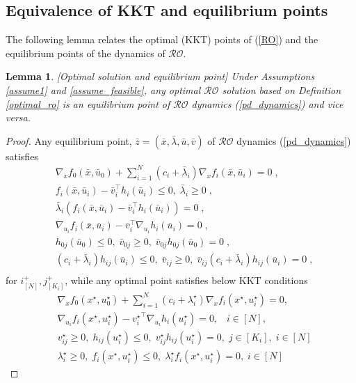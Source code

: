 \documentclass[journal,twoside,web]{ieeecolor}
\newtheorem{lemma}{Lemma}
\begin{document}
\subsection{Equivalence of KKT and equilibrium points} \label{kkt<=>eq.sec}
 The following lemma relates the optimal (KKT) points of (\ref{RO}) and the equilibrium points of the dynamics of $\mathcal{RO}$.
\begin{lemma}\label{kkttoeq.lem}[Optimal solution and equilibrium point]
Under Assumptions \ref{assume1} and \ref{assume_feasible}, any optimal $\mathcal{RO}$ solution based on Definition \ref{optimal_ro} is an equilibrium point of $\mathcal{RO}$ dynamics (\ref{pd_dynamics}) and vice versa.
\end{lemma}
\begin{proof}
Any equilibrium point, $\bar{z}=(\bar{x},\bar{\lambda},\bar{u},\bar{v})$  of $\mathcal{RO}$ dynamics (\ref{pd_dynamics}) satisfies
\begin{align*}
&\nabla_x f_0(\bar x,\bar{u}_0)+  \sum_{i=1}^N (c_i+\bar \lambda_i) \nabla_x f_i(\bar x,\bar u_i)=0\;,\\
&f_{i}(\bar x,\bar u_i)-\bar v_i^\top h_i(\bar u_i)\leq 0,\;\bar \lambda_i\geq 0\;,\\
&\bar \lambda_i(f_{i}(\bar x,\bar u_i)-\bar v_i^\top h_i(\bar u_i))=0\;,\\
&\nabla_{u_i} f_i(\bar x,\bar u_i)-\bar v_i^\top \nabla_{u_i} h_i(\bar u_i)=0\;,\\
&h_{0j}(\bar u_0)\leq 0,\; \bar v_{0j}\geq 0,\;\bar v_{0j}h_{0j}(\bar u_0)=0\;,\\
& (c_i+\bar{\lambda}_i) h_{ij}(\bar u_i)\leq 0,\; \bar v_{ij}\geq 0,\;\bar v_{ij}(c_i+\bar \lambda_i) h_{ij}(\bar u_i)=0\;,\\
\end{align*}
for $i^+_{[N]},j^+_{[K_i]}$, while any optimal point satisfies below KKT conditions
\begin{align}
    &\nabla_x f_0(x^\star,u_0^\star)+  \sum_{i=1}^N(c_i+\lambda^\star_i) \nabla_x f_i(x^\star,u_i^\star)=0, \label{kkt1} \\
    &\nabla_{u_i} f_i(x^\star,u_i^\star)-{v_i^\star}^\top \nabla_{u_i} h_i(u_i^\star)=0, \;\;\; i \in [N], \label{kkt2} \\
    &v_{ij}^\star\geq 0,\; h_{ij}(u_i^\star)\leq 0,\;v_{ij}^\star h_{ij}(u_i^\star)=0, \; j \in [K_i], \; i \in [N] \label{kkt3} \\
    &\lambda_i^\star\geq 0,\;f_{i}(x^\star,u_i^\star)\leq 0,\;\lambda_i^\star f_{i}(x^\star,u_i^\star)=0, \; i \in [N] \label{kkt4}
\end{align}


\end{proof}
\end{document}
